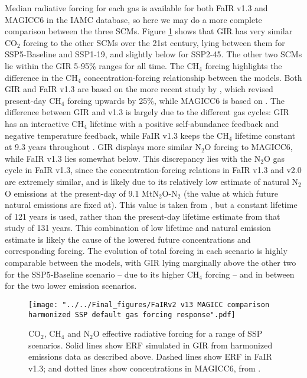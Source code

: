 \documentclass[gmd, manuscript]{copernicus}
\begin{document}
Median radiative forcing for each gas is available for both FaIR v1.3 and MAGICC6 in the IAMC database, so here we may do a more complete comparison between the three SCMs. Figure \ref{fig:SSPforcs} shows that GIR has very similar CO$_2$ forcing to the other SCMs over the 21st century, lying between them for SSP5-Baseline and SSP1-19, and slightly below for SSP2-45. The other two SCMs lie within the GIR 5-95\% ranges for all time. The CH$_4$ forcing highlights the difference in the CH$_4$ concentration-forcing relationship between the models. Both GIR and FaIR v1.3 are based on the more recent study by \cite{Etminan2016}, which revised present-day CH$_4$ forcing upwards by 25\%, while MAGICC6 is based on \cite{Myhre2013a}. The difference between GIR and v1.3 is largely due to the different gas cycles: GIR has an interactive CH$_4$ lifetime with a positive self-abundance feedback and negative temperature feedback, while FaIR v1.3 keeps the CH$_4$ lifetime constant at 9.3 years throughout \citep{Smith2017}. GIR displays more similar N$_2$O forcing to MAGICC6, while FaIR v1.3 lies somewhat below. This discrepancy lies with the N$_2$O gas cycle in FaIR v1.3, since the concentration-forcing relations in FaIR v1.3 and v2.0 are extremely similar, and is likely due to its relatively low estimate of natural N$_2$O emissions at the present-day of 9.1 MtN$_2$O-N$_2$ (the value at which future natural emissions are fixed at). This value is taken from \cite{Prather2012}, but a constant lifetime of 121 years is used, rather than the present-day lifetime estimate from that study of 131 years. This combination of low lifetime and natural emission estimate is likely the cause of the lowered future concentrations and corresponding forcing. The evolution of total forcing in each scenario is highly comparable between the models, with GIR lying marginally above the other two for the SSP5-Baseline scenario -- due to its higher CH$_4$ forcing -- and in between for the two lower emission scenarios.\\
\begin{figure}[t]
    \texttt{[image: "../../Final\_figures/FaIRv2 v13 MAGICC comparison harmonized SSP default gas forcing response".pdf]}
    \caption{CO$_2$, CH$_4$ and N$_2$O effective radiative forcing for a range of SSP scenarios. Solid lines show ERF simulated in GIR from harmonized emissions data as described above. Dashed lines show ERF in FaIR v1.3; and dotted lines show concentrations in MAGICC6, from \cite{Huppmann:2018:scenario-data}.}
    \label{fig:SSPforcs}
\end{figure}
\end{document}
